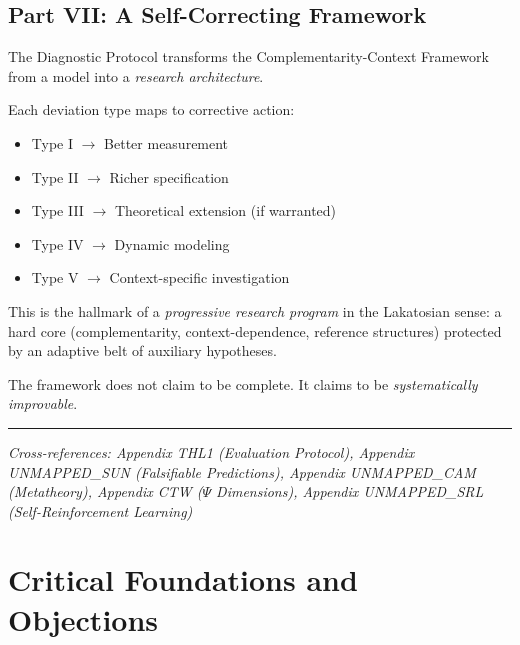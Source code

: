 \subsection{Part VII: A Self-Correcting Framework}

The Diagnostic Protocol transforms the Complementarity-Context Framework 
from a model into a \textit{research architecture}.

\begin{center}
\end{center}

Each deviation type maps to corrective action:
\begin{itemize}
    \item Type I $\rightarrow$ Better measurement
    \item Type II $\rightarrow$ Richer specification
    \item Type III $\rightarrow$ Theoretical extension (if warranted)
    \item Type IV $\rightarrow$ Dynamic modeling
    \item Type V $\rightarrow$ Context-specific investigation
\end{itemize}

This is the hallmark of a \textit{progressive research program} in the Lakatosian 
sense: a hard core (complementarity, context-dependence, reference structures) 
protected by an adaptive belt of auxiliary hypotheses.

The framework does not claim to be complete. It claims to be 
\textit{systematically improvable}.

\vspace{1em}
\hrule
\vspace{0.5em}
\noindent\textit{Cross-references: Appendix THL1 (Evaluation Protocol), 
Appendix UNMAPPED_SUN (Falsifiable Predictions), Appendix UNMAPPED_CAM (Metatheory), 
Appendix CTW ($\Psi$ Dimensions), Appendix UNMAPPED_SRL (Self-Reinforcement Learning)}




\section{Critical Foundations and Objections}
\label{sec:eps-foundations}

